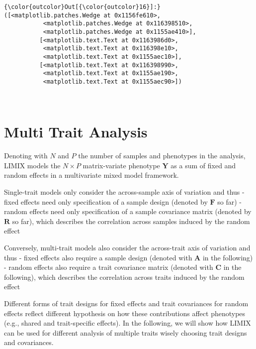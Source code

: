 \documentclass{article}
\begin{document}
            \begin{Verbatim}[commandchars=\\\{\}]
{\color{outcolor}Out[{\color{outcolor}16}]:} ([<matplotlib.patches.Wedge at 0x1156fe610>,
           <matplotlib.patches.Wedge at 0x116398510>,
           <matplotlib.patches.Wedge at 0x1155ae410>],
          [<matplotlib.text.Text at 0x1163986d0>,
           <matplotlib.text.Text at 0x116398e10>,
           <matplotlib.text.Text at 0x1155aec10>],
          [<matplotlib.text.Text at 0x116398990>,
           <matplotlib.text.Text at 0x1155ae190>,
           <matplotlib.text.Text at 0x1155aec90>])
\end{Verbatim}
        
    \begin{center}
    \end{center}
    { \hspace*{\fill} \\}
    

    \section{Multi Trait Analysis}


    Denoting with $N$ and $P$ the number of samples and phenotypes in the
analysis, LIMIX models the $N \times P$ matrix-variate phenotype
$\mathbf{Y}$ as a sum of fixed and random effects in a multivariate
mixed model framework.

Single-trait models only consider the across-sample axis of variation
and thus - fixed effects need only specification of a sample design
(denoted by $\mathbf{F}$ so far) - random effects need only
specification of a sample covariance matrix (denoted by $\mathbf{R}$ so
far), which describes the correlation across samples induced by the
random effect

Conversely, multi-trait models also consider the across-trait axis of
variation and thus - fixed effects also require a sample design (denoted
with $\mathbf{A}$ in the following) - random effects also require a
trait covariance matrix (denoted with $\mathbf{C}$ in the following),
which describes the correlation across traits induced by the random
effect

Different forms of trait designs for fixed effects and trait covariances
for random effects reflect different hypothesis on how these
contributions affect phenotypes (e.g., shared and trait-specific
effects). In the following, we will show how LIMIX can be used for
different analysis of multiple traits wisely choosing trait designs and
covariances.
\end{document}

